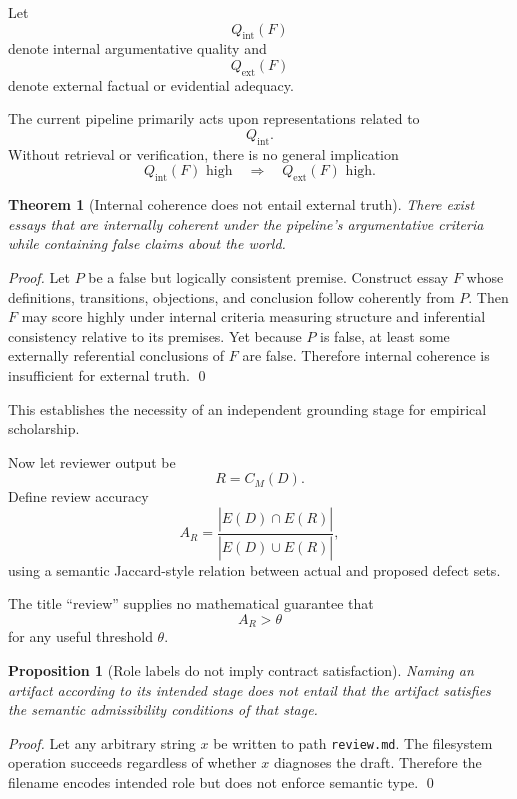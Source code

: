 \documentclass[11pt]{article}
\newtheorem{proposition}[definition]{Proposition}
\newtheorem{theorem}[definition]{Theorem}
\begin{document}
Let
\[
    Q_{\mathrm{int}}(F)
\]
denote internal argumentative quality and
\[
    Q_{\mathrm{ext}}(F)
\]
denote external factual or evidential adequacy.

The current pipeline primarily acts upon representations related to
\[
    Q_{\mathrm{int}}.
\]
Without retrieval or verification, there is no general implication
\[
    Q_{\mathrm{int}}(F)\text{ high}
    \quad\Longrightarrow\quad
    Q_{\mathrm{ext}}(F)\text{ high}.
\]

\begin{theorem}[Internal coherence does not entail external truth]
There exist essays that are internally coherent under the pipeline's argumentative criteria while containing false claims about the world.
\end{theorem}

\begin{proof}
Let \(P\) be a false but logically consistent premise. Construct essay \(F\) whose definitions, transitions, objections, and conclusion follow coherently from \(P\). Then \(F\) may score highly under internal criteria measuring structure and inferential consistency relative to its premises. Yet because \(P\) is false, at least some externally referential conclusions of \(F\) are false. Therefore internal coherence is insufficient for external truth. \qed
\end{proof}

This establishes the necessity of an independent grounding stage for empirical scholarship.

Now let reviewer output be
\[
    R=C_M(D).
\]
Define review accuracy
\[
    A_R
    =
    \frac{
        |E(D)\cap\widehat E(R)|
    }{
        |E(D)\cup\widehat E(R)|
    },
\]
using a semantic Jaccard-style relation between actual and proposed defect sets.

The title ``review'' supplies no mathematical guarantee that
\[
    A_R>\theta
\]
for any useful threshold \(\theta\).

\begin{proposition}[Role labels do not imply contract satisfaction]
Naming an artifact according to its intended stage does not entail that the artifact satisfies the semantic admissibility conditions of that stage.
\end{proposition}

\begin{proof}
Let any arbitrary string \(x\) be written to path \texttt{review.md}. The filesystem operation succeeds regardless of whether \(x\) diagnoses the draft. Therefore the filename encodes intended role but does not enforce semantic type. \qed
\end{proof}
\end{document}
